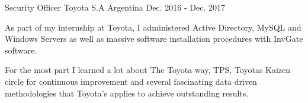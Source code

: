 \begin{cventries}
	\cventry
	{Security Officer} %
	{Toyota S.A} %
	{Argentina} %
	{Dec. 2016 - Dec. 2017} %
	{
		\begin{cvitems} %
			\item {As part of my internship at Toyota, I administered Active Directory, MySQL and Windows Servers as well as massive software installation procedures with InvGate software.}
			\item {For the most part I learned a lot about The Toyota way, TPS, Toyotas Kaizen circle for continuous improvement and several fascinating data driven methodologies that Toyota's applies to achieve outstanding results.}
		\end{cvitems}
	}
\end{cventries}
